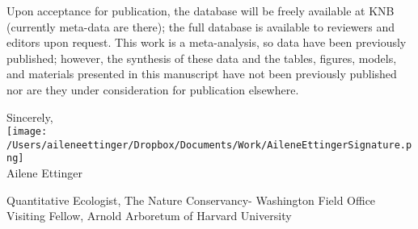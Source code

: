 \documentclass[11.5pt,a4paper]{letter}
\begin{document}
\begin{letter}{}
\par Upon acceptance for publication, the database will be freely available at KNB (currently meta-data are there); the full database is available to reviewers and editors upon request. This work is a meta-analysis, so data have been previously published; however, the synthesis of these data and the tables, figures, models, and materials presented in this manuscript have not been previously published nor are they under consideration for publication elsewhere.

Sincerely,\\

\texttt{[image: /Users/aileneettinger/Dropbox/Documents/Work/AileneEttingerSignature.png]} \\
Ailene Ettinger\\
\begin{footnotesize}
Quantitative Ecologist, The Nature Conservancy- Washington Field Office\\
Visiting Fellow, Arnold Arboretum of Harvard University 
\end{footnotesize}

\end{letter}
\end{document}
